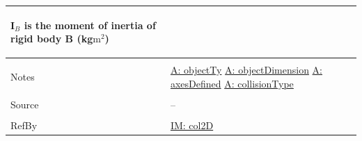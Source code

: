 \documentclass[12pt]{article}
\begin{document}
\begin{minipage}{\textwidth}
\begin{tabular}{>{\raggedright}p{}>{\raggedright\arraybackslash}p{}}
\begin{symbDescription}
              \item{${\mathbf{I}_{B}}$ is the moment of inertia of rigid body B (kg$\text{m}^{2}$)}
              \end{symbDescription}
\\ \midrule \\
Notes & \hyperref[assumpOT]{A: objectTy}
        \hyperref[assumpOD]{A: objectDimension}
        \hyperref[assumpAD]{A: axesDefined}
        \hyperref[assumpCT]{A: collisionType}
\\ \midrule \\
Source & --
\\ \midrule \\
RefBy & \hyperref[IM:col2D]{IM: col2D}
\\ \bottomrule
\end{tabular}
\end{minipage}
\par~
\end{document}
